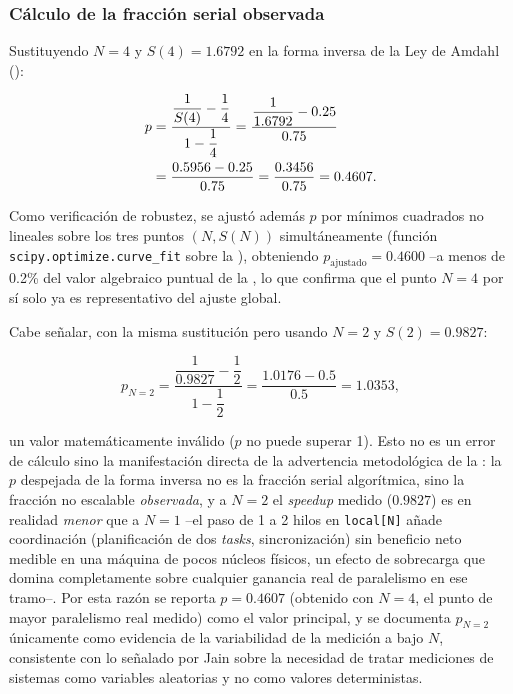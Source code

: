 \documentclass[11pt,a4paper]{article}
\begin{document}
    \subsubsection{Cálculo de la fracción serial observada}

    Sustituyendo $N=4$ y $S(4)=1.6792$ en la forma inversa de la Ley de Amdahl
    ():

    \begin{align}
        p &= \frac{\dfrac{1}{S(4)} - \dfrac{1}{4}}{1 - \dfrac{1}{4}}
        = \frac{\dfrac{1}{1.6792} - 0.25}{0.75} \notag \\
        &= \frac{0.5956 - 0.25}{0.75}
        = \frac{0.3456}{0.75}
        = 0.4607.
        \label{eq:calculo-p}
    \end{align}

    Como verificación de robustez, se ajustó además $p$ por mínimos cuadrados no lineales sobre los
    tres puntos $(N, S(N))$ simultáneamente (función \texttt{scipy.optimize.curve\_fit} sobre la
    ), obteniendo $p_{\text{ajustado}} = 0.4600$ --a menos de 0.2\% del valor
    algebraico puntual de la , lo que confirma que el punto $N=4$ por sí solo ya
    es representativo del ajuste global.

    Cabe señalar, con la misma sustitución pero usando $N=2$ y $S(2)=0.9827$:

    \begin{equation}
        p_{N=2} = \frac{\dfrac{1}{0.9827} - \dfrac{1}{2}}{1 - \dfrac{1}{2}}
        = \frac{1.0176 - 0.5}{0.5}
        = 1.0353,
        \label{eq:calculo-p-n2}
    \end{equation}

    un valor matemáticamente inválido ($p$ no puede superar 1). Esto no es un error de cálculo sino
    la manifestación directa de la advertencia metodológica de la : la
    $p$ despejada de la forma inversa no es la fracción serial algorítmica, sino la fracción no
    escalable \emph{observada}, y a $N=2$ el \emph{speedup} medido ($0.9827$) es en realidad
    \emph{menor} que a $N=1$ --el paso de 1 a 2 hilos en \texttt{local[N]} añade coordinación
    (planificación de dos \emph{tasks}, sincronización) sin beneficio neto medible en una máquina de
    pocos núcleos físicos, un efecto de sobrecarga que domina completamente sobre cualquier ganancia
    real de paralelismo en ese tramo--. Por esta razón se reporta $p=0.4607$ (obtenido con $N=4$,
    el punto de mayor paralelismo real medido) como el valor principal, y se documenta $p_{N=2}$
    únicamente como evidencia de la variabilidad de la medición a bajo $N$, consistente con lo
    señalado por Jain sobre la necesidad de tratar mediciones de sistemas como variables
    aleatorias y no como valores deterministas.
\end{document}
